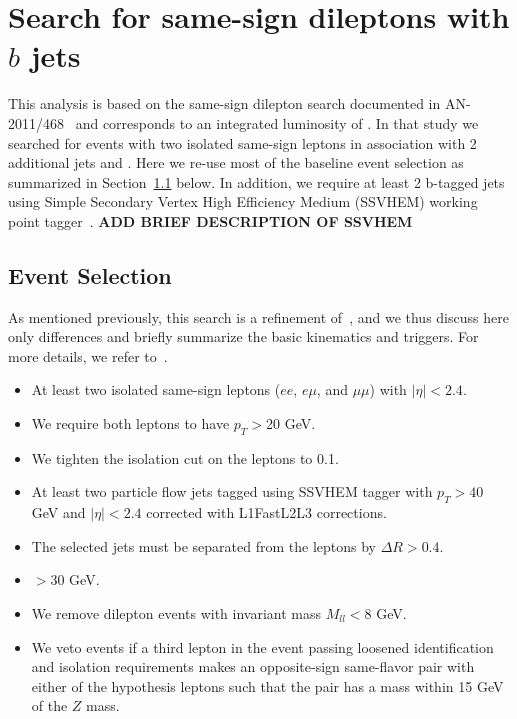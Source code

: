 \section{Search for same-sign dileptons with $b$ jets}
\label{sec:searchbtag}

This analysis is based on the same-sign dilepton search documented in AN-2011/468~\cite{ssnote2011} and corresponds to an
integrated luminosity of \intLumi. In that study we searched for events with two isolated same-sign leptons
in association with 2 additional jets and \met. Here we re-use most of the baseline event selection as summarized in Section~\ref{sec:eventsel} below. 
In addition, we require at least 2 b-tagged jets using Simple Secondary Vertex High Efficiency 
Medium (SSVHEM) working point tagger~\cite{BTVPAS2011}. 
{\bf ADD BRIEF DESCRIPTION OF SSVHEM}

\subsection{Event Selection}
\label{sec:eventsel}

As mentioned previously, this search is a refinement of~\cite{ssnote2011}, and we thus discuss here only differences and briefly summarize the basic kinematics and triggers.
For more details, we refer to~\cite{ssnote2011}.

\begin{itemize}
\item At least two isolated same-sign leptons ($ee$, $e\mu$, and $\mu\mu$) with $|\eta| < 2.4$.
\item We require both leptons to have $p_T>$20 GeV.
\item We tighten the isolation cut on the leptons to 0.1.
\item At least two particle flow jets tagged using SSVHEM tagger with $p_T > 40$ GeV and $|\eta| < 2.4$
corrected with L1FastL2L3 corrections.
\item The selected jets must be separated from the leptons by $\Delta R > 0.4$.
\item \met $> 30$ GeV.
\item We remove dilepton events with invariant mass $M_{ll} < 8$ GeV.
\item We veto events if a third lepton in the event passing loosened identification and isolation requirements makes an opposite-sign same-flavor pair with either of the hypothesis leptons such that the pair has a mass within 15 GeV of the $Z$ mass.
\end{itemize}

